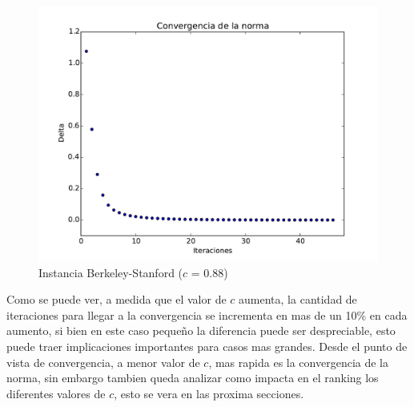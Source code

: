 \begin{figure}[h]
\centering
\includegraphics[scale=0.4]{images/normas/web-BerkStan_22.pdf}
\caption{Instancia Berkeley-Stanford ($c$ = 0.88)}
\label{timePageRank}
\end{figure}

Como se puede ver, a medida que el valor de $c$ aumenta, la cantidad de iteraciones para llegar a la convergencia se incrementa en mas de un 10\% en cada aumento, si bien en este caso pequeño la diferencia puede ser despreciable, esto puede traer implicaciones importantes para casos mas grandes. Desde el punto de vista de convergencia, a menor valor de $c$, mas rapida es la convergencia de la norma, sin embargo tambien queda analizar como impacta en el ranking los diferentes valores de $c$, esto se vera en las proxima secciones.